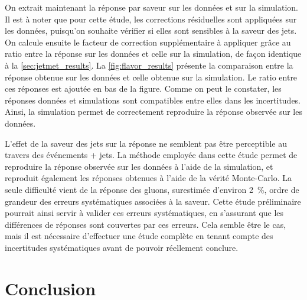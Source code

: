 On extrait maintenant la réponse par saveur sur les données et sur la simulation. Il est à noter que pour cette étude, les corrections résiduelles sont appliquées sur les données, puisqu'on souhaite vérifier si elles sont sensibles à la saveur des jets. On calcule ensuite le facteur de correction supplémentaire à appliquer grâce au ratio entre la réponse sur les données et celle sur la simulation, de façon identique à la \cref{sec:jetmet_results}. La \cref{fig:flavor_results} présente la comparaison entre la réponse obtenue sur les données et celle obtenue sur la simulation. Le ratio entre ces réponses est ajoutée en bas de la figure. Comme on peut le constater, les réponses données et simulations sont compatibles entre elles dans les incertitudes. Ainsi, la simulation permet de correctement reproduire la réponse observée sur les données.

\bigskip


L'effet de la saveur des jets sur la réponse ne semblent pas être perceptible au travers des événements \Pgamma + jets. La méthode employée dans cette étude permet de reproduire la réponse observée sur les données à l'aide de la simulation, et reproduit également les réponses obtenues à l'aide de la vérité Monte-Carlo. La seule difficulté vient de la réponse des gluons, surestimée d'environ \tilde\SI{2}{\percent}, ordre de grandeur des erreurs systématiques associées à la saveur. Cette étude préliminaire pourrait ainsi servir à valider ces erreurs systématiques, en s'assurant que les différences de réponses sont couvertes par ces erreurs. Cela semble être le cas, mais il est nécessaire d'effectuer une étude complète en tenant compte des incertitudes systématiques avant de pouvoir réellement conclure.

\section{Conclusion}

